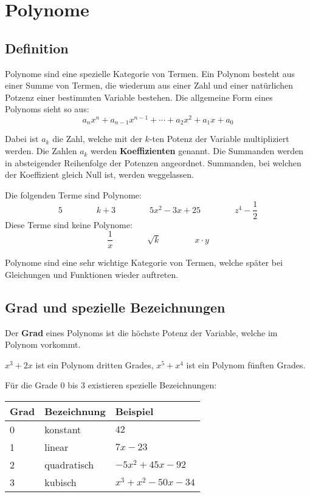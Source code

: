 \newpage
\section{Polynome}

\subsection{Definition}

Polynome sind eine spezielle Kategorie von Termen. Ein Polynom besteht aus einer Summe von Termen, die wiederum aus einer Zahl und einer natürlichen Potzenz einer bestimmten Variable bestehen. Die allgemeine Form eines Polynoms sieht so aus:
\[
  a_{n}x^{n} + a_{n-1}x^{n-1} + \cdots + a_{2}x^{2} + a_{1}x + a_{0}
\]

Dabei ist $a_{k}$ die Zahl, welche mit der $k$-ten Potenz der Variable multipliziert werden. Die Zahlen $a_{k}$ werden \textbf{Koeffizienten} genannt. Die Summanden werden in absteigender Reihenfolge der Potenzen angeordnet. Summanden, bei welchen der Koeffizient gleich Null ist, werden weggelassen.

\begin{example}
  Die folgenden Terme sind Polynome:
  \[
    5 \qquad\qquad k+3 \qquad\qquad 5x^{2}-3x+25 \qquad\qquad z^{4}-\frac{1}{2}
  \]
  Diese Terme sind keine Polynome:
  \[
    \frac{1}{x} \qquad\qquad \sqrt{k} \qquad\qquad x\cdot y
  \]
\end{example}

Polynome sind eine sehr wichtige Kategorie von Termen, welche später bei Gleichungen und Funktionen wieder auftreten.

\subsection{Grad und spezielle Bezeichnungen}

Der \textbf{Grad} eines Polynoms ist die höchste Potenz der Variable, welche im Polynom vorkommt.

\begin{example}
  $x^{3}+2x$ ist ein Polynom dritten Grades, $x^{5}+x^{4}$ ist ein Polynom fünften Grades.
\end{example}

Für die Grade 0 bis 3 existieren spezielle Bezeichnungen:
\begin{center}
  \def\arraystretch{1.1}
  \begin{tabularx}{0.9\textwidth}{XXR}
  \toprule
    \textbf{Grad} & \textbf{Bezeichnung} & \textbf{Beispiel} \\
   & konstant & $42$ \\
   & linear & $7x-23$ \\
   & quadratisch & $-5x^{2}+45x-92$ \\
   & kubisch & $x^{3}+x^{2}-50x-34$ \\
  \bottomrule
  \end{tabularx}
\end{center}


